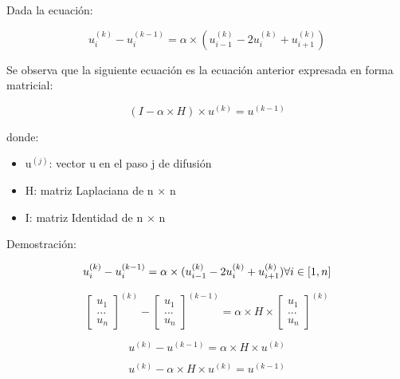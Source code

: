 Dada la ecuación:

\begin{equation}
u_{i}^{(k)} - u_{i}^{(k-1)} = \alpha \times (u_{i-1}^{(k)} - 2u_{i}^{(k)} + u_{i+1}^{(k)})
\end{equation}

Se observa que la siguiente ecuación es la ecuación anterior expresada en forma matricial:

\begin{equation}
(I - \alpha \times H) \times u^{(k)} = u^{(k-1)}
\end{equation}

donde:

\begin{itemize}
  \item u$^{(j)}$: vector u en el paso j de difusión
  \item H: matriz Laplaciana de n $\times$ n
  \item I: matriz Identidad de n $\times$ n
\end{itemize}

Demostración:

\begin{equation}
u_{i}^{(k)} - u_{i}^{(k-1)} = \alpha \times (u_{i-1}^{(k)} - 2u_{i}^{(k)} + u_{i+1}^{(k)}) \space \forall i \in [1, n]
\end{equation}

\begin{equation}
\begin{bmatrix}
u_{1}\\
...\\
u_{n}
\end{bmatrix}^{(k)}
-
\begin{bmatrix}
u_{1}\\
...\\
u_{n}
\end{bmatrix}^{(k-1)}
=
\alpha \times H \times
\begin{bmatrix}
u_{1}\\
...\\
u_{n}
\end{bmatrix}^{(k)}
\end{equation}

\begin{equation}
u^{(k)} - u^{(k-1)} = \alpha \times H \times u^{(k)}
\end{equation}

\begin{equation}
u^{(k)} - \alpha \times H \times u^{(k)} =  u^{(k-1)}
\end{equation}

